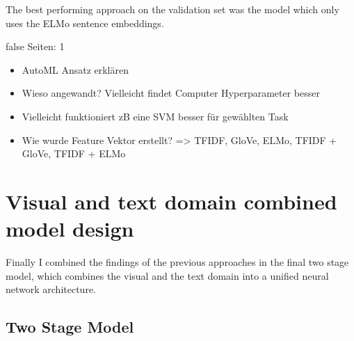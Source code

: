 \documentclass[draft,final,oneside]{vutinfth} %
\begin{document}
The best performing approach on the validation set was the model which only uses the ELMo sentence embeddings.

\if false
Seiten: 1

\begin{itemize}
\item AutoML Ansatz erklären
\item Wieso angewandt? Vielleicht findet Computer Hyperparameter besser
\item Vielleicht funktioniert zB eine SVM besser für gewählten Task
\item Wie wurde Feature Vektor erstellt? => TFIDF, GloVe, ELMo, TFIDF + GloVe, TFIDF + ELMo
\end{itemize}
\fi

\section{Visual and text domain combined model design}

Finally I combined the findings of the previous approaches in the final two stage model, which combines the visual and the text domain into a unified neural network architecture.

\subsection{Two Stage Model} \label{twostagemodelsection}
\end{document}
